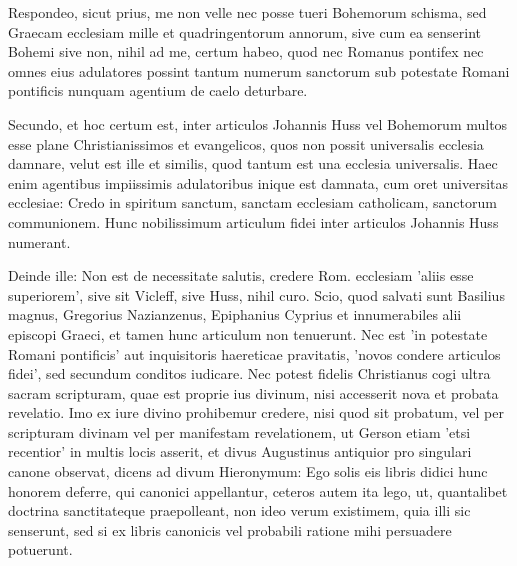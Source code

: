 Respondeo, sicut prius, me non velle nec posse tueri Bohemorum schisma, sed Graecam ecclesiam mille et quadringentorum annorum, sive cum ea senserint Bohemi sive non, nihil ad me, certum habeo, quod nec Romanus pontifex nec omnes eius adulatores possint tantum numerum sanctorum sub potestate Romani pontificis nunquam agentium de caelo deturbare.

Secundo, et hoc certum est, inter articulos Johannis Huss vel Bohemorum multos esse plane Christianissimos et evangelicos, quos non possit universalis ecclesia damnare, velut est ille et similis, quod tantum est una ecclesia universalis. Haec enim agentibus impiissimis adulatoribus inique est damnata, cum oret universitas ecclesiae: Credo in spiritum sanctum, sanctam ecclesiam catholicam, sanctorum communionem. Hunc nobilissimum articulum fidei inter articulos Johannis Huss numerant.

Deinde ille: Non est de necessitate salutis, credere Rom. ecclesiam 'aliis esse superiorem', sive sit Vicleff, sive Huss, nihil curo. Scio, quod salvati sunt Basilius magnus, Gregorius Nazianzenus, Epiphanius Cyprius et innumerabiles alii episcopi Graeci, et tamen hunc articulum non tenuerunt. Nec est 'in potestate Romani pontificis' aut inquisitoris haereticae pravitatis, 'novos condere articulos fidei', sed secundum conditos iudicare. Nec potest fidelis Christianus cogi ultra sacram scripturam, quae est proprie ius divinum, nisi accesserit nova et probata revelatio. Imo ex iure divino prohibemur credere, nisi quod sit probatum, vel per scripturam divinam vel per manifestam revelationem, ut Gerson etiam 'etsi recentior' in multis locis asserit, et divus Augustinus antiquior pro singulari canone observat, dicens ad divum Hieronymum: Ego solis eis libris didici hunc honorem deferre, qui canonici appellantur, ceteros autem ita lego, ut, quantalibet doctrina sanctitateque praepolleant, non ideo verum existimem, quia illi sic senserunt, sed si ex libris canonicis vel probabili ratione mihi persuadere potuerunt.


